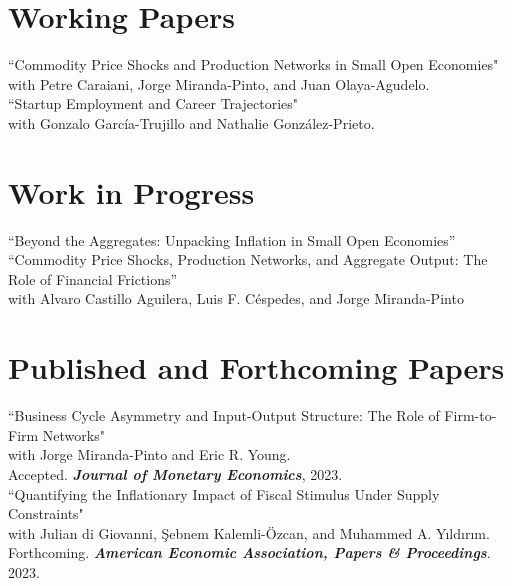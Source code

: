 \documentclass[11pt]{article}
\begin{document}
\section*{Working Papers}

``Commodity Price Shocks and Production Networks in Small Open Economies"\\
 with Petre Caraiani, Jorge Miranda-Pinto, and Juan Olaya-Agudelo.\\[-0.1in]

 ``Startup Employment and Career Trajectories"\\
 with Gonzalo Garc\'ia-Trujillo and Nathalie Gonz\'alez-Prieto.

\section*{Work in Progress}

``Beyond the Aggregates: Unpacking Inflation in Small Open Economies''\\[-0.1in]

``Commodity Price Shocks, Production Networks, and Aggregate Output: The Role of Financial Frictions''\\
with Alvaro Castillo Aguilera, Luis F. C\'espedes, and Jorge Miranda-Pinto\\[-0.1in]









\section*{Published and Forthcoming Papers}

``Business Cycle Asymmetry and Input-Output Structure: The Role of Firm-to-Firm Networks"\\
 with Jorge Miranda-Pinto and Eric R. Young.\\
Accepted. \textbf{\textit{Journal of Monetary Economics}}, 2023.\\[-0.1in]


``Quantifying the Inflationary Impact of Fiscal Stimulus Under Supply Constraints"\\
with Julian di Giovanni, \c{S}ebnem Kalemli-\"{O}zcan, and Muhammed A. Y{\i}ld{\i}r{\i}m. \\
Forthcoming. \textbf{\textit{American Economic Association, Papers \& Proceedings}}. 2023.\\[-0.1in]
\end{document}
